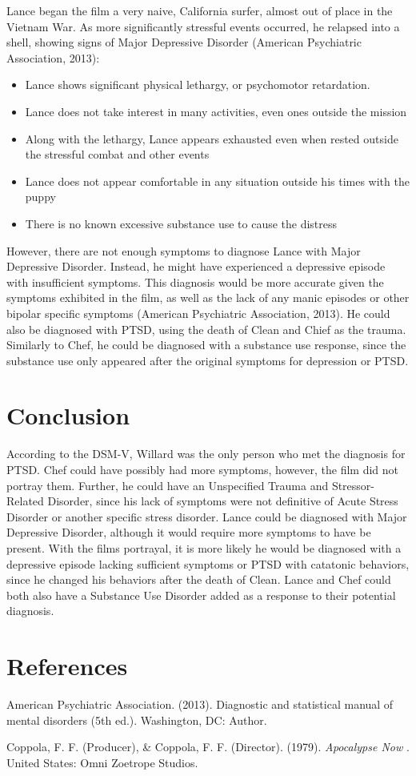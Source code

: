 \documentclass[a4paper,man,natbib]{apa6}
\begin{document}
Lance began the film a very naive, California surfer, almost out of place in the Vietnam War. As more significantly stressful events occurred, he relapsed into a shell, showing signs of Major Depressive Disorder (American Psychiatric Association, 2013):
\begin{itemize}
\item Lance shows significant physical lethargy, or psychomotor retardation.
\item Lance does not take interest in many activities, even ones outside the mission
\item Along with the lethargy, Lance appears exhausted even when rested outside the stressful combat and other events
\item Lance does not appear comfortable in any situation outside his times with the puppy
\item There is no known excessive substance use to cause the distress
\end{itemize}
However, there are not enough symptoms to diagnose Lance with Major Depressive Disorder. Instead, he might have experienced a depressive episode with insufficient symptoms. This diagnosis would be more accurate given the symptoms exhibited in the film, as well as the lack of any manic episodes or other bipolar specific symptoms (American Psychiatric Association, 2013). He could also be diagnosed with PTSD, using the death of Clean and Chief as the trauma. Similarly to Chef, he could be diagnosed with a substance use response, since the substance use only appeared after the original symptoms for depression or PTSD.

\section{Conclusion}	

According to the DSM-V, Willard was the only person who met the diagnosis for PTSD. Chef could have possibly had more symptoms, however, the film did not portray them. Further, he could have an Unspecified Trauma and Stressor-Related Disorder, since his lack of symptoms were not definitive of Acute Stress Disorder or another specific stress disorder. Lance could be diagnosed with Major Depressive Disorder, although it would require more symptoms to have be present. With the films portrayal, it is more likely he would be diagnosed with a depressive episode lacking sufficient symptoms or PTSD with catatonic behaviors, since he changed his behaviors after the death of Clean. Lance and Chef could both also have a Substance Use Disorder added as a response to their potential diagnosis. \\

\raggedbottom
\pagebreak
\section{References}

\noindent American Psychiatric Association. (2013). Diagnostic and statistical manual of mental
\indent disorders (5th ed.). Washington, DC: Author.

\noindent Coppola, F. F. (Producer), \& Coppola, F. F. (Director). (1979). \textit{Apocalypse Now}
. United States: Omni Zoetrope Studios.
\end{document}
